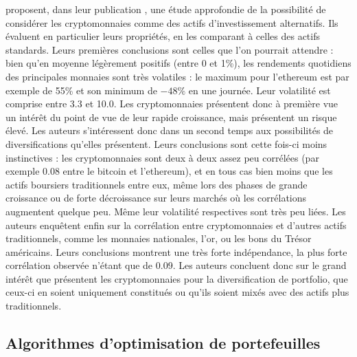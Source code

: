 \documentclass[a4paper, 10pt]{article}
\begin{document}
\textbf{\citet{Elendner2018}} proposent, dans leur publication \textbf{}, une étude approfondie de la possibilité de considérer les cryptomonnaies comme des actifs d'investissement alternatifs. Ils évaluent en particulier leurs propriétés, en les comparant à celles des actifs standards. Leurs premières conclusions sont celles que l'on pourrait attendre : bien qu'en moyenne légèrement positifs (entre 0 et 1\%), les rendements quotidiens des principales monnaies sont très volatiles : le maximum pour l'ethereum est par exemple de 55\% et son minimum de $-48\%$ en une journée. Leur volatilité est comprise entre 3.3 et 10.0. Les cryptomonnaies présentent donc à première vue un intérêt du point de vue de leur rapide croissance, mais présentent un risque élevé. Les auteurs s'intéressent donc dans un second temps aux possibilités de diversifications qu'elles présentent. Leurs conclusions sont cette fois-ci moins instinctives : les cryptomonnaies sont deux à deux assez peu corrélées (par exemple 0.08 entre le bitcoin et l'ethereum), et en tous cas bien moins que les actifs boursiers traditionnels entre eux, même lors des phases de grande croissance ou de forte décroissance sur leurs marchés où les corrélations augmentent quelque peu. Même leur volatilité respectives sont très peu liées. Les auteurs enquêtent enfin sur la corrélation entre cryptomonnaies et d'autres actifs traditionnels, comme les monnaies nationales, l'or, ou les bons du Trésor américains. Leurs conclusions montrent une très forte indépendance, la plus forte corrélation observée n'étant que de 0.09. Les auteurs concluent donc sur le grand intérêt que présentent les cryptomonnaies pour la diversification de portfolio, que ceux-ci en soient uniquement constitués ou qu'ils soient mixés avec des actifs plus traditionnels.

\subsection{Algorithmes d'optimisation de portefeuilles}
\end{document}
